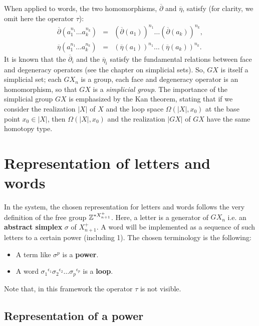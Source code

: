 When applied to words, the two homomorphisms, $\overline{\partial}$ and $\overline{\eta}$,  satisfy
(for cla\-ri\-ty, we omit here the operator $\tau$):
\begin{eqnarray*}
\overline{\partial}(a_1^{n_1}\ldots a_k^{n_k}) &=& (\overline{\partial}(a_1))^{n_1}\ldots 
                                                   (\overline{\partial}(a_k))^{n_k}, \\
\overline{\eta}(a_1^{n_1}\ldots a_k^{n_k}) &=& (\overline{\eta}(a_1))^{n_1}\ldots (\overline{\eta}(a_k))^{n_k}. 
\end{eqnarray*}
It is known  that the $\overline{\partial}_i$ and the $\overline{\eta}_i$ satisfy the
fundamental relations between face and degeneracy operators (see the chapter on simplicial sets). So,
$GX$ is itself a simplicial set; each $GX_n$ is a group, each face and degeneracy operator
is an homomorphism, so that $GX$ is a {\em simplicial group}.
The importance of the simplicial group $GX$ is emphasized by the Kan theorem, stating
that if we consider the realization $|X|$ of $X$ and the loop space  $\Omega(|X|, x_0)$ at 
the base point $x_0 \in |X|$,  then $\Omega(|X|, x_0)$ and 
the realization $|GX|$ of $GX$ have the same  homotopy type. 

\section {Representation of letters and words}

In the system, the chosen representation for letters and words follows the very definition
of the free group ${{\Bbb Z}}^{*X_{n+1}^+}$. Here, a letter is a generator of $GX_n$ i.e. an {\bf abstract simplex}
$\sigma$ of $X^+_{n+1}$. 
A word will be implemented  as a sequence of such letters to a certain power (including 1).
The chosen terminology is the following:
\begin{itemize}
\item A term like $\sigma^p$ is a {\bf power}.
\item A word ${\sigma_1}^{\epsilon_1} {\sigma_2}^{\epsilon_2} \ldots {\sigma_p}^{\epsilon_p}$
is a {\bf loop}. 
\end{itemize}
Note that, in this framework the operator $\tau$ is not visible.

\subsection{Representation of a power}

